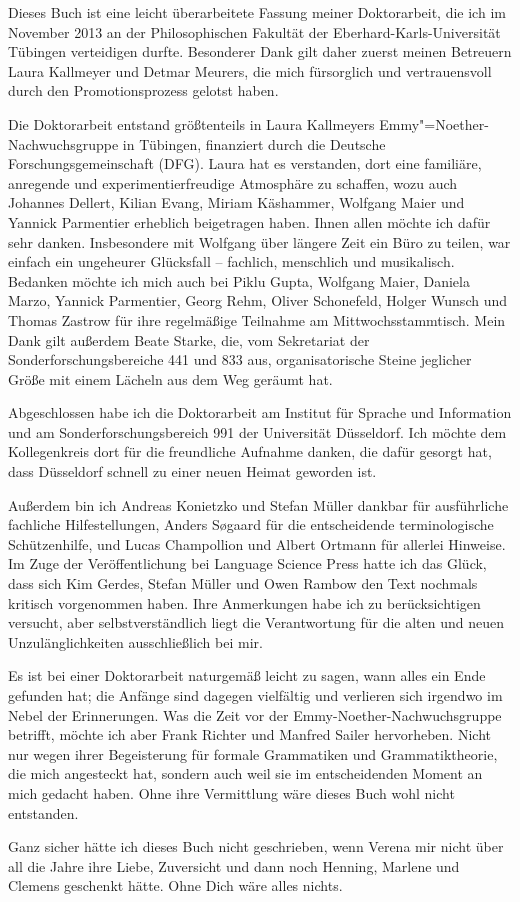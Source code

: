 

Dieses Buch ist eine leicht überarbeitete Fassung meiner Doktorarbeit, die ich im November 2013 an der Philosophischen Fakultät der Eberhard-Karls-Universität Tübingen verteidigen durfte. Besonderer Dank gilt daher zuerst meinen Betreuern Laura Kallmeyer und Detmar Meurers, die mich fürsorglich und vertrauensvoll durch den Promotionsprozess gelotst haben. 

Die Doktorarbeit entstand größtenteils in Laura Kallmeyers Emmy"=Noe\-ther-Nachwuchsgruppe in Tübingen, finanziert durch die Deutsche Forschungsgemeinschaft (DFG). Laura hat es verstanden, dort eine familiäre, anregende und experimentierfreudige Atmosphäre zu schaffen, wozu auch Johannes Dellert, Kilian Evang, Miriam Käshammer, Wolfgang Maier und Yannick Parmentier erheblich beigetragen haben. Ihnen allen möchte ich dafür sehr danken. Insbesondere mit Wolfgang über längere Zeit ein Büro zu teilen, war einfach ein ungeheurer Glücksfall -- fachlich, menschlich und musikalisch. Bedanken möchte ich mich auch bei Piklu Gupta, Wolfgang Maier, Daniela Marzo, Yannick Parmentier, Georg Rehm, Oliver Schonefeld, Holger Wunsch und Thomas Zastrow für ihre regelmäßige Teilnahme am Mittwochsstammtisch. Mein Dank gilt außerdem Beate Starke, die, vom Sekretariat der Sonderforschungsbereiche 441 und 833 aus, organisatorische Steine jeglicher Größe mit einem Lächeln aus dem Weg geräumt hat.

Abgeschlossen habe ich die Doktorarbeit am Institut für Sprache und Information und am Sonderforschungsbereich 991 der Universität Düsseldorf. Ich möchte dem Kollegenkreis dort für die freundliche Aufnahme danken, die dafür gesorgt hat, dass Düsseldorf schnell zu einer neuen Heimat geworden ist.    

Außerdem bin ich Andreas Konietzko und Stefan Müller dankbar für ausführliche fachliche Hilfestellungen, Anders S\o{}gaard für die entscheidende terminologische Schützenhilfe, und Lucas Champollion und Albert Ortmann für allerlei Hinweise. Im Zuge der Veröffentlichung bei Language Science Press hatte ich das Glück, dass sich Kim Gerdes, Stefan Müller und Owen Rambow den Text nochmals kritisch vorgenommen haben. Ihre Anmerkungen habe ich zu berücksichtigen versucht, aber selbstverständlich liegt die Verantwortung für die alten und neuen Unzulänglichkeiten ausschließlich bei mir.


Es ist bei einer Doktorarbeit naturgemäß leicht zu sagen, wann alles ein Ende gefunden hat; die Anfänge sind dagegen vielfältig und verlieren sich irgendwo im Nebel der Erinnerungen. Was die Zeit vor der Emmy-Noether-Nachwuchsgruppe betrifft, möchte ich aber Frank Richter und Manfred Sailer hervorheben. Nicht nur wegen ihrer Begeisterung für formale Grammatiken und Grammatiktheorie, die mich angesteckt hat, sondern auch weil sie im entscheidenden Moment an mich gedacht haben. Ohne ihre Vermittlung wäre dieses Buch wohl nicht entstanden. 

Ganz sicher hätte ich dieses Buch nicht geschrieben, wenn Verena mir nicht über all die Jahre ihre Liebe, Zuversicht und dann noch Henning, Marlene und Clemens geschenkt hätte. Ohne Dich wäre alles nichts.
